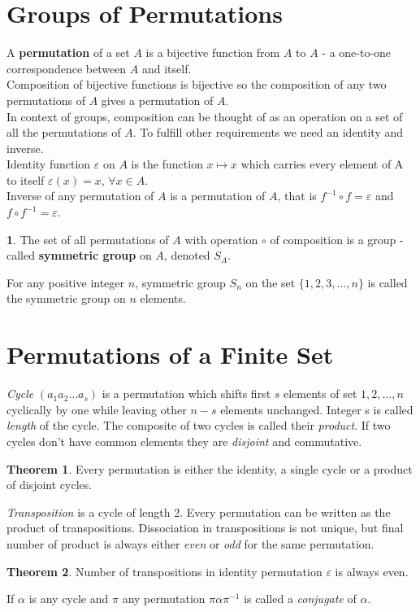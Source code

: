 \documentclass[a4paper,12pt]{article}
\theoremstyle{definition}
\newtheorem{definition}{}[section]
\theoremstyle{axiom}
\theoremstyle{theorem}
\newtheorem{theorem}{Theorem}[section]
\theoremstyle{lemma}
\begin{document}
\section{Groups of Permutations}
A \textbf{permutation} of a set $A$ is a bijective function from $A$ to $A$ - a one-to-one correspondence between $A$ and itself. 
\\
Composition of bijective functions is bijective so the composition of any two permutations of $A$ gives a permutation of $A$.
\\
In context of groups, composition can be thought of as an operation on a set of all the permutations of $A$. To fulfill other requirements we need an identity and inverse.
\\
Identity function $\varepsilon$ on $A$ is the function $x \mapsto x$ which carries every element of A to itself $\varepsilon(x) = x$, $\forall x \in A$.
\\
Inverse of any permutation of $A$ is a permutation of $A$, that is $f^{-1} \circ f = \varepsilon$ and $f \circ f^{-1}= \varepsilon$.
\begin{definition}{}
        \textnormal{The set of all permutations of $A$ with operation $\circ$ of composition is a group - called \textbf{symmetric group} on $A$, denoted $S_A$.}
\end{definition}
For any positive integer $n$, symmetric group $S_n$ on the set $\{1, 2, 3, \dots, n\}$ is called the symmetric group on $n$ elements.
\section{Permutations of a Finite Set}
\textit{Cycle} $(a_1a_2 \dots a_s)$ is a permutation which shifts first $s$ elements of set ${1,2,\dots ,n}$ cyclically by one while leaving other $n-s$ elements unchanged. Integer s is called \textit{length} of the cycle. The composite of two cycles is called their \textit{product}. If two cycles don't have common elements they are \textit{disjoint} and commutative.
\begin{theorem}{}
Every permutation is either the identity, a single cycle or a product of disjoint cycles.
\end{theorem}
\textit{Transposition} is a cycle of length 2. Every permutation can be written as the product of transpositions. Dissociation in transpositions is not unique, but final number of product is always either \textit{even} or \textit{odd} for the same permutation.
\begin{theorem}{}
Number of transpositions in identity permutation $\varepsilon$ is always even.
\end{theorem}
If $\alpha$ is any cycle and $\pi$ any permutation $\pi\alpha\pi^{-1}$ is called a \textit{conjugate} of $\alpha$.
\end{document}

